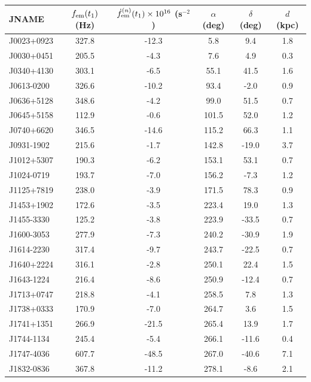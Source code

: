 \documentclass[fleqn,usenatbib,useAMS]{mnras}
\begin{document}
\begin{table}
\begin{tabular}{lccccc}
	\toprule
	JNAME &    $f_{\rm em} (t_1)$ (Hz) &  $\dot{f}^{(n)}_{\rm em}(t_1)\times 10^{16}$ (s$^{-2}$) &  $\alpha$ (deg) &  $\delta$ (deg) &  $d$ (kpc) \\
	\midrule
	J0023+0923 & 327.8 &      -12.3 &   5.8 &    9.4 &   1.8 \\
	J0030+0451 & 205.5 &       -4.3 &   7.6 &    4.9 &   0.3 \\
	J0340+4130 & 303.1 &       -6.5 &  55.1 &   41.5 &   1.6 \\
	J0613-0200 & 326.6 &      -10.2 &  93.4 &   -2.0 &   0.9 \\
	J0636+5128 & 348.6 &       -4.2 &  99.0 &   51.5 &   0.7 \\
	J0645+5158 & 112.9 &       -0.6 & 101.5 &   52.0 &   1.2 \\
	J0740+6620 & 346.5 &      -14.6 & 115.2 &   66.3 &   1.1 \\
	J0931-1902 & 215.6 &       -1.7 & 142.8 &  -19.0 &   3.7 \\
	J1012+5307 & 190.3 &       -6.2 & 153.1 &   53.1 &   0.7 \\
	J1024-0719 & 193.7 &       -7.0 & 156.2 &   -7.3 &   1.2 \\
	J1125+7819 & 238.0 &       -3.9 & 171.5 &   78.3 &   0.9 \\
	J1453+1902 & 172.6 &       -3.5 & 223.4 &   19.0 &   1.3 \\
	J1455-3330 & 125.2 &       -3.8 & 223.9 &  -33.5 &   0.7 \\
	J1600-3053 & 277.9 &       -7.3 & 240.2 &  -30.9 &   1.9 \\
	J1614-2230 & 317.4 &       -9.7 & 243.7 &  -22.5 &   0.7 \\
	J1640+2224 & 316.1 &       -2.8 & 250.1 &   22.4 &   1.5 \\
	J1643-1224 & 216.4 &       -8.6 & 250.9 &  -12.4 &   0.7 \\
	J1713+0747 & 218.8 &       -4.1 & 258.5 &    7.8 &   1.3 \\
	J1738+0333 & 170.9 &       -7.0 & 264.7 &    3.6 &   1.5 \\
	J1741+1351 & 266.9 &      -21.5 & 265.4 &   13.9 &   1.7 \\
	J1744-1134 & 245.4 &       -5.4 & 266.1 &  -11.6 &   0.4 \\
	J1747-4036 & 607.7 &      -48.5 & 267.0 &  -40.6 &   7.1 \\
	J1832-0836 & 367.8 &      -11.2 & 278.1 &   -8.6 &   2.1 \\

\end{tabular}
\end{table}
\end{document}
